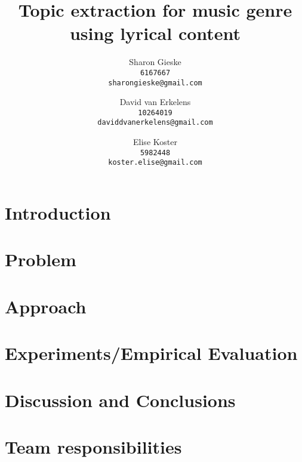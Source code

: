 \documentclass{article} %
\title{Topic extraction for music genre using lyrical content}
\author{
Sharon Gieske \\
\texttt{6167667}\\
\texttt{sharongieske@gmail.com} \\
\and
David van Erkelens\\
\texttt{10264019}\\
\texttt{daviddvanerkelens@gmail.com} \\
\and
Elise Koster \\
\texttt{5982448}\\
\texttt{koster.elise@gmail.com}
}
\begin{document}
\maketitle

\begin{abstract}

\end{abstract}
\clearpage
\section{Introduction}


\section{Problem}


\section{Approach}


\section{Experiments/Empirical Evaluation}


\section{Discussion and Conclusions}


\section{Team responsibilities}




\end{document}
